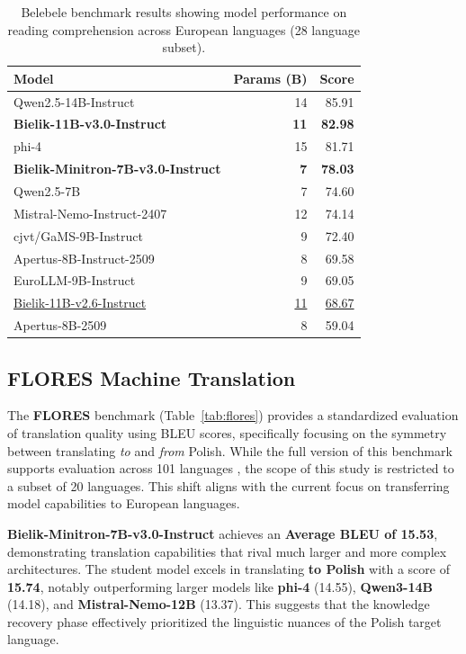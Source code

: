 \documentclass{article}
\begin{document}
\begin{table}[t]
  \centering
  \small
  \begin{tabular}{lrr}
  \toprule
  \textbf{Model} & \textbf{Params (B)} & \textbf{Score} \\
  \midrule
  Qwen2.5-14B-Instruct & 14 & 85.91 \\
  \textbf{Bielik-11B-v3.0-Instruct} & \textbf{11} & \textbf{82.98} \\
  phi-4 & 15 & 81.71 \\
  \textbf{Bielik-Minitron-7B-v3.0-Instruct} & \textbf{7} & \textbf{78.03} \\
  Qwen2.5-7B & 7 & 74.60 \\
  Mistral-Nemo-Instruct-2407 & 12 & 74.14 \\
  cjvt/GaMS-9B-Instruct & 9 & 72.40 \\
  Apertus-8B-Instruct-2509 & 8 & 69.58 \\
  EuroLLM-9B-Instruct & 9 & 69.05 \\
  \underline{Bielik-11B-v2.6-Instruct} & \underline{11} & \underline{68.67} \\
  Apertus-8B-2509 & 8 & 59.04 \\
  \bottomrule
  \end{tabular}
  \caption{Belebele benchmark results showing model performance on reading comprehension across European languages (28 language subset).}
  \label{tab:belebele}
\end{table}

\subsection{FLORES Machine Translation}
The \textbf{FLORES} benchmark (Table~\ref{tab:flores}) provides a standardized evaluation of translation quality using BLEU scores, specifically focusing on the symmetry between translating \textit{to} and \textit{from} Polish. While the full version of this benchmark supports evaluation across 101 languages \cite{goyal2021flores101evaluationbenchmarklowresource}, the scope of this study is restricted to a subset of 20 languages. This shift aligns with the current focus on transferring model capabilities to European languages.

\textbf{Bielik-Minitron-7B-v3.0-Instruct} achieves an \textbf{Average BLEU of 15.53}, demonstrating translation capabilities that rival much larger and more complex architectures. The student model excels in translating \textbf{to Polish} with a score of \textbf{15.74}, notably outperforming larger models like \textbf{phi-4} (14.55), \textbf{Qwen3-14B} (14.18), and \textbf{Mistral-Nemo-12B} (13.37). This suggests that the knowledge recovery phase effectively prioritized the linguistic nuances of the Polish target language.
\end{document}
